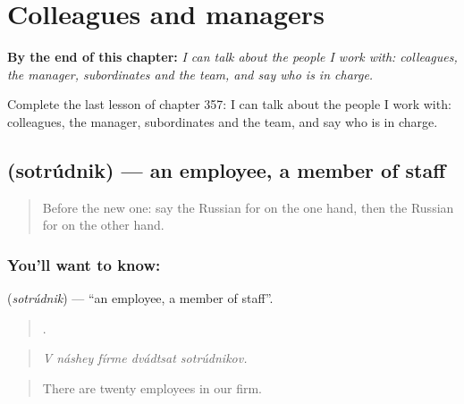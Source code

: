 
\chapter{Colleagues and managers}
\label{ch:ru-colleagues-and-managers}

\begin{chapteropening}
\textbf{By the end of this chapter:} \emph{I can talk about the people I work with: colleagues, the manager, subordinates and the team, and say who is in charge.}

Complete the last lesson of chapter 357: I can talk about the people I work with: colleagues, the manager, subordinates and the team, and say who is in charge.
\end{chapteropening}

\section[\texorpdfstring{\ru{сотрудник} (sotrúdnik)}{сотрудник (sotrúdnik)}]{ (sotrúdnik) — an employee, a member of staff}

\label{lesson:RU-C357-sotrudnik}



\begin{quote}
Before the new one: say the Russian for on the one hand, then the Russian for on the other hand.
\end{quote}

\subsection*{You'll want to know: }
\textbf{} (\emph{sotrúdnik}) — \textquotedblleft{}an employee, a member of staff\textquotedblright{}.

\begin{quote}
    .
\end{quote}

\begin{quote}
\emph{V náshey fírme dvádtsat sotrúdnikov.}
\end{quote}

\begin{quote}
There are twenty employees in our firm.
\end{quote}

